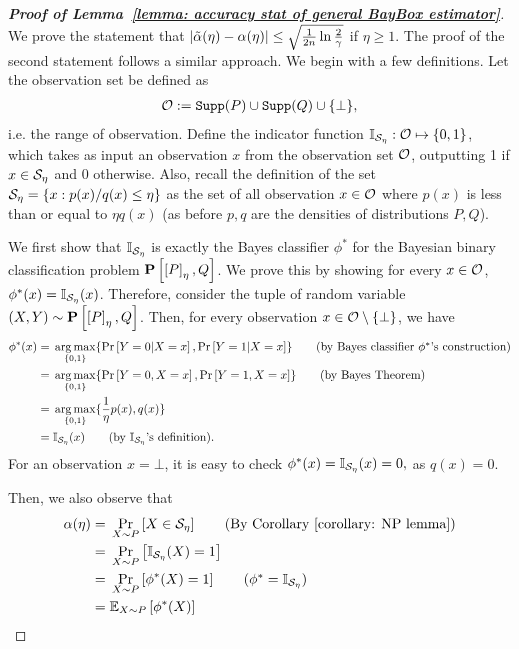 \begin{proof}[\textbf{Proof of Lemma~\ref{lemma: accuracy stat of general BayBox estimator}}]
    \label{proof: for lemma: accuracy stat of general BayBox estimator}
    We prove the statement that $\left| {\tilde{\alpha}(\eta) - \alpha(\eta)} \right| \leq \sqrt{\frac{1}{2n}\ln{\frac{2}{\gamma}}}$ if $\eta \geq 1$. The proof of the second statement follows a similar approach. We begin with a few definitions.
    Let the observation set be defined as  
    \begin{align*}
        \mathcal{O} := \mathtt{Supp}(P) \cup \mathtt{Supp}(Q) \cup \{\bot\},
    \end{align*}
    i.e. the range of observation. Define the indicator function $\mathbb{I}_{\mathcal{S}_{\eta}} : \mathcal{O} \mapsto \{0,1\}$, which takes as input an observation $x$ from the observation set $\mathcal{O}$, outputting 1 if $x \in \mathcal{S}_\eta$ and $0$ otherwise. Also, recall the definition of the set $\mathcal{S}_{\eta} = \{x: p(x)/q(x) \leq \eta \}$ 
    as the set of all observation $x \in \mathcal{O}$ where $p(x)$ is less than or equal to $\eta q(x)$ (as before $p, q$ are the densities of distributions $P, Q$).
    
    We first show that $\mathbb{I}_{\mathcal{S}_{\eta}}$ is exactly the Bayes classifier $\phi^{*}$ for the Bayesian binary classification problem $\mathbf{P}\left[\left[P\right]_{\eta}, Q\right]$. We prove this by showing for every $x \in \mathcal{O}$, $\phi^{*}(x) = \mathbb{I}_{\mathcal{S}_{\eta}}(x)$. Therefore, consider the tuple of random variable $(X, Y) \sim \mathbf{P}\left[\left[P\right]_{\eta}, Q\right]$. Then, for every observation $x \in \mathcal{O} \setminus \{\bot\}$, we have  
    \begin{align*}
       \phi^{*}(x) ={}& \argmax_{\bits} \{\pr{\rY = 0 | \rX = x}, \pr{\rY = 1 | \rX = x}\} \tag{by Bayes classifier $\phi^{*}$'s construction}\\
        ={}& \argmax_{\bits} \{\pr{\rY = 0, \rX = x}, \pr{\rY = 1, \rX = x}\} \tag{by Bayes Theorem}\\
        ={}& \argmax_{\bits} \{\frac{1}{\eta}p(x), q(x)\} \\
        ={}& \mathbb{I}_{\cS_{\eta}}(x) \tag{by $\mathbb{I}_{\cS_{\eta}}$'s definition}.
    \end{align*}
    For an observation $x = \bot$, it is easy to check $\phi^{*}(x) = \mathbb{I}_{\mathcal{S}_{\eta}}(x) = 0,$ as $q(x) = 0.$

    Then, we also observe that  
    \begin{align*}
        \alpha(\eta) ={}& \prdis{\rX \sim P}{\rX \in \cS_{\eta}} \tag{By Corollary~\ref{corollary: NP lemma}}\\
        ={}& \prdis{\rX \sim P}{\mathbb{I}_{\cS_{\eta}}(\rX) = 1} \\
        ={}& \prdis{\rX \sim P}{\phi^*(\rX) = 1} \tag{$\phi^* = \mathbb{I}_{\cS_{\eta}}$}\\
        ={}& \Exf{\rX \sim P}{\phi^*(\rX)}
    \end{align*}


\end{proof}
